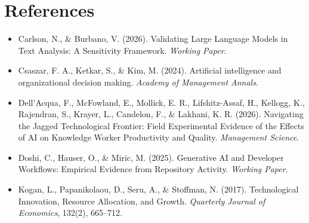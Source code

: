 \documentclass[11pt]{article}
\begin{document}
\section*{References}
\begin{itemize}
    \item Carlson, N., \& Burbano, V. (2026). Validating Large Language Models in Text Analysis: A Sensitivity Framework. \textit{Working Paper}.
    \item Csaszar, F. A., Ketkar, S., \& Kim, M. (2024). Artificial intelligence and organizational decision making. \textit{Academy of Management Annals}.
    \item Dell'Acqua, F., McFowland, E., Mollick, E. R., Lifshitz-Assaf, H., Kellogg, K., Rajendran, S., Krayer, L., Candelon, F., \& Lakhani, K. R. (2026). Navigating the Jagged Technological Frontier: Field Experimental Evidence of the Effects of AI on Knowledge Worker Productivity and Quality. \textit{Management Science}.
    \item Doshi, C., Hauser, O., \& Miric, M. (2025). Generative AI and Developer Workflows: Empirical Evidence from Repository Activity. \textit{Working Paper}.
    \item Kogan, L., Papanikolaou, D., Seru, A., \& Stoffman, N. (2017). Technological Innovation, Resource Allocation, and Growth. \textit{Quarterly Journal of Economics}, 132(2), 665--712.
\end{itemize}
\end{document}
